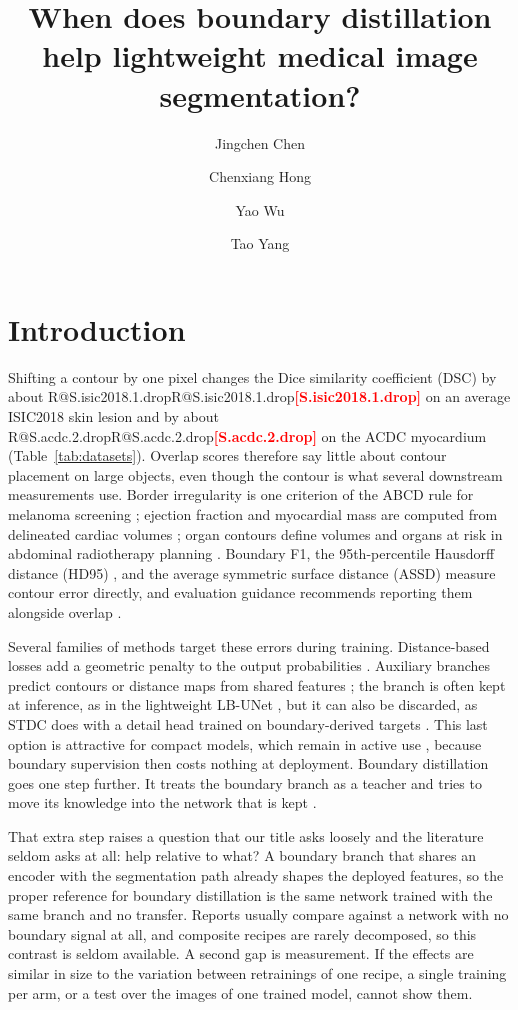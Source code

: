 \documentclass[fleqn,10pt,lineno]{wlpeerj}
\title{When does boundary distillation help lightweight medical image segmentation?}
\author[1]{Jingchen Chen}
\author[1]{Chenxiang Hong}
\author[1]{Yao Wu}
\author[1]{Tao Yang}
\affil[1]{Future Technology School, Shenzhen Technology University, Shenzhen, Guangdong, China}
\makeatletter
\newcommand{\R}[1]{\ifcsname R@#1\endcsname\csname R@#1\endcsname\else\textbf{\textcolor{red}{[#1]}}\fi}
\makeatother
\begin{document}
\flushbottom
\maketitle
\thispagestyle{empty}

\section*{Introduction}

Shifting a contour by one pixel changes the Dice similarity coefficient (DSC) by about \R{S.isic2018.1.drop} on an average ISIC2018 skin lesion and by about \R{S.acdc.2.drop} on the ACDC myocardium (Table~\ref{tab:datasets}). Overlap scores therefore say little about contour placement on large objects, even though the contour is what several downstream measurements use. Border irregularity is one criterion of the ABCD rule for melanoma screening \citep{Nachbar1994ABCD}; ejection fraction and myocardial mass are computed from delineated cardiac volumes \citep{Bernard2018Deep}; organ contours define volumes and organs at risk in abdominal radiotherapy planning \citep{Jabbour2014Upper}. Boundary F1, the 95th-percentile Hausdorff distance (HD95) \citep{Huttenlocher1993Comparing}, and the average symmetric surface distance (ASSD) measure contour error directly, and evaluation guidance recommends reporting them alongside overlap \citep{Taha2015Metrics, Maier-Hein2024Metrics}.

Several families of methods target these errors during training. Distance-based losses add a geometric penalty to the output probabilities \citep{Kervadec2019Boundary, Karimi2020Reducing, Celaya2024A, Sun2023Boundary, Wang2022Active}. Auxiliary branches predict contours or distance maps from shared features \citep{Murugesan2019PsiNet, Takikawa2019GatedSCNN}; the branch is often kept at inference, as in the lightweight LB-UNet \citep{Xu2024LBUNet}, but it can also be discarded, as STDC does with a detail head trained on boundary-derived targets \citep{Fan2021STDC}. This last option is attractive for compact models, which remain in active use \citep{Ruan2023EGEUNet, Jiang2024LVUNet}, because boundary supervision then costs nothing at deployment. Boundary distillation goes one step further. It treats the boundary branch as a teacher and tries to move its knowledge into the network that is kept \citep{Liu2024BPKD, Wang2023MISSU, Banerjee2024Dual}.

That extra step raises a question that our title asks loosely and the literature seldom asks at all: help relative to what? A boundary branch that shares an encoder with the segmentation path already shapes the deployed features, so the proper reference for boundary distillation is the same network trained with the same branch and no transfer. Reports usually compare against a network with no boundary signal at all, and composite recipes are rarely decomposed, so this contrast is seldom available. A second gap is measurement. If the effects are similar in size to the variation between retrainings of one recipe, a single training per arm, or a test over the images of one trained model, cannot show them.
\end{document}

